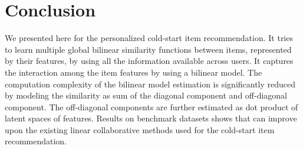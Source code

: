 \section{Conclusion} \label{ch:bilinear:conclusion}
We presented here \CF for the personalized cold-start \TOPN item recommendation.
It tries to learn multiple global bilinear similarity functions between items, 
represented by their features, by
using all the information available across users. It captures the
interaction among the item features by using a bilinear model.
The computation complexity of the bilinear model estimation is significantly reduced by
modeling the similarity as sum of the diagonal component and off-diagonal component.
The off-diagonal components are further estimated as dot product of latent spaces of
features. Results on benchmark datasets shows that \CF can improve upon the existing
linear collaborative methods used for the cold-start item recommendation. 

\iffalse
In future, we would like to try \CF on
different kinds of transaction datasets. We would also like to see what effects
does the non-negativity constraint on
the model parameters lead to. We will also try \CF on a related but relevant problem
of the actual rating prediction instead of \TOPN recommendation.
\fi


